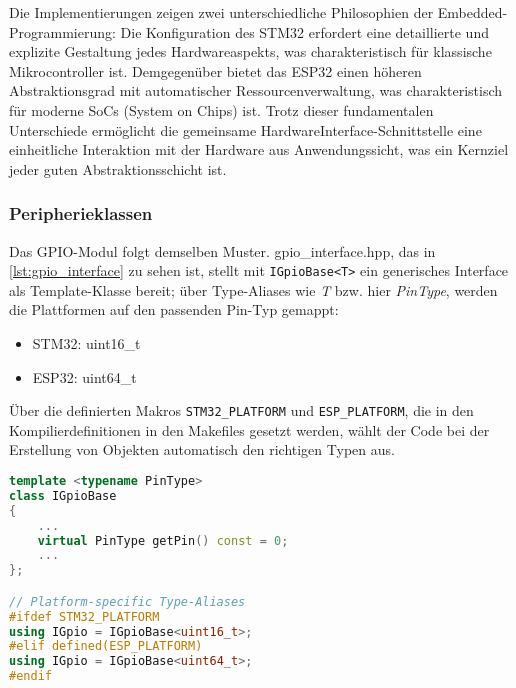 Die Implementierungen zeigen zwei unterschiedliche Philosophien der Embedded-Programmierung: 
Die Konfiguration des STM32 erfordert eine detaillierte und explizite Gestaltung jedes Hardwareaspekts, was charakteristisch für klassische Mikrocontroller ist.
Demgegenüber bietet das ESP32 einen höheren Abstraktionsgrad mit automatischer Ressourcenverwaltung, was charakteristisch für moderne SoCs (System on Chips) ist.
Trotz dieser fundamentalen Unterschiede ermöglicht die gemeinsame HardwareInterface-Schnittstelle eine einheitliche Interaktion mit der Hardware aus Anwendungssicht, was ein Kernziel jeder guten Abstraktionsschicht ist.

\subsubsection{Peripherieklassen}
Das GPIO-Modul folgt demselben Muster.
gpio\_interface.hpp, das in \cref{lst:gpio_interface} zu sehen ist, stellt mit \texttt{IGpioBase<T>} ein generisches Interface als Template-Klasse bereit; über Type-Aliases wie \textit{T} bzw. hier \textit{PinType}, werden die Plattformen auf den passenden Pin-Typ gemappt:

\begin{itemize}
	\item STM32: uint16\_t
	\item ESP32: uint64\_t
\end{itemize}

Über die definierten Makros \texttt{STM32\_PLATFORM} und \texttt{ESP\_PLATFORM}, die in den Kompilierdefinitionen in den Makefiles gesetzt werden, wählt der Code bei der Erstellung von Objekten automatisch den richtigen Typen aus.
\newpage

\begin{lstlisting}[language=C++, caption={Ausschnitt aus der Interfaceklasse IGpioBase.}, label={lst:gpio_interface}]
template <typename PinType>
class IGpioBase
{
	...
    virtual PinType getPin() const = 0;
	...	
};

// Platform-specific Type-Aliases
#ifdef STM32_PLATFORM
using IGpio = IGpioBase<uint16_t>;
#elif defined(ESP_PLATFORM)
using IGpio = IGpioBase<uint64_t>;
#endif
\end{lstlisting}

